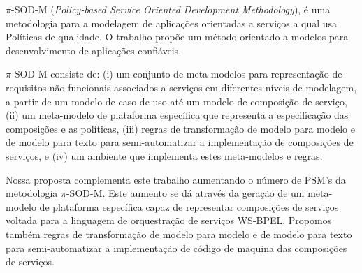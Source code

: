 $\pi$-SOD-M (\textit{Policy-based Service Oriented Development Methodology}), é uma metodologia para a modelagem de aplicações orientadas a serviços a qual usa Políticas de qualidade. O trabalho propõe um método orientado a modelos para desenvolvimento de aplicações confiáveis. 

$\pi$-SOD-M consiste de: (i) um conjunto de meta-modelos para representação de requisitos não-funcionais associados a serviços em diferentes níveis de modelagem, a partir de um modelo de caso de uso até um modelo de composição de serviço, (ii) um meta-modelo de plataforma específica que representa a especificação das composições e as políticas, (iii) regras de transformação de modelo para modelo e de modelo para texto para semi-automatizar a implementação de composições de serviços, e (iv) um ambiente que implementa estes meta-modelos e regras. 

Nossa proposta complementa este trabalho aumentando o número de PSM's da metodologia $\pi$-SOD-M. Este aumento se dá através da geração de um meta-modelo de plataforma específica capaz de representar composições de serviços voltada para a linguagem de orquestração de serviços WS-BPEL. Propomos também regras de transformação de modelo para modelo e de modelo para texto para semi-automatizar a implementação de código de maquina das composições de serviços.


